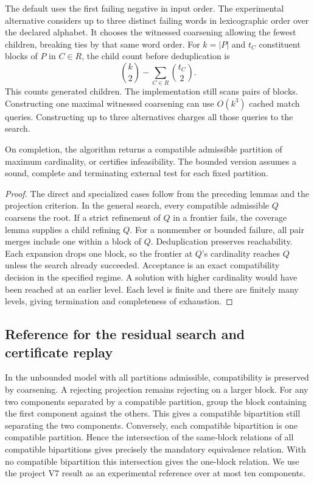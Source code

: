 The default uses the first failing negative in input order. The
experimental alternative considers up to three distinct failing
words in lexicographic order over the declared alphabet. It chooses
the witnessed coarsening allowing the fewest children, breaking
ties by that same word order. For \(k=|P|\) and \(t_C\) constituent
blocks of \(P\) in \(C\in R\), the child count before deduplication is
\[
   \binom{k}{2}-\sum_{C\in R}\binom{t_C}{2}.
\]
This counts generated children. The implementation still scans pairs
of blocks. Constructing one maximal witnessed coarsening can use
\(O(k^3)\) cached match queries. Constructing up to three alternatives
charges all those queries to the search.

\begin{theorem}
On completion, the algorithm returns a compatible admissible
partition of maximum cardinality, or certifies infeasibility.
The bounded version assumes a sound, complete and terminating
external test for each fixed partition.
\end{theorem}
\begin{proof}
The direct and specialized cases follow from the preceding lemmas
and the projection criterion. In the general search, every compatible
admissible \(Q\) coarsens the root. If a strict refinement of \(Q\)
in a frontier fails, the coverage lemma supplies a child refining
\(Q\). For a nonmember or bounded failure, all pair merges include
one within a block of \(Q\). Deduplication preserves reachability.
Each expansion drops one block, so the frontier at \(Q\)'s
cardinality reaches \(Q\) unless the search already succeeded.
Acceptance is an exact compatibility decision in the specified
regime. A solution with higher cardinality would have been reached
at an earlier level. Each level is finite and there are finitely
many levels, giving termination and completeness of exhaustion.
\end{proof}

\subsection{Reference for the residual search and certificate replay}

In the unbounded model with all partitions admissible, compatibility
is preserved by coarsening. A rejecting projection remains rejecting
on a larger block. For any two components separated by a compatible
partition, group the block containing the first component against the
others. This gives a compatible bipartition still separating the two
components. Conversely, each compatible bipartition is one compatible
partition. Hence the intersection of the same-block relations of all
compatible bipartitions gives precisely the mandatory equivalence
relation. With no compatible bipartition this intersection gives the
one-block relation. We use the project V7 result as an experimental
reference over at most ten components.

